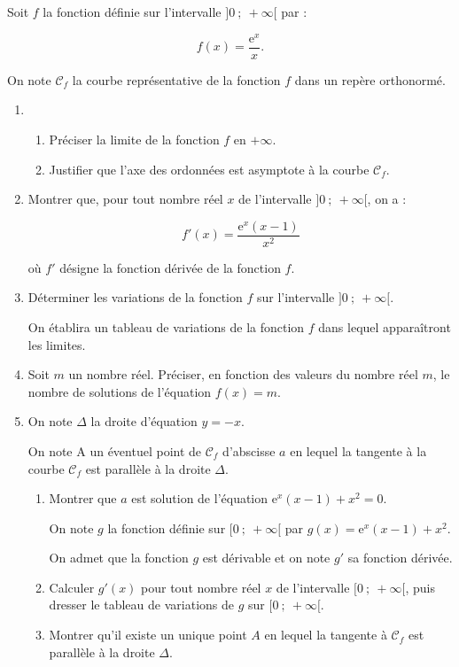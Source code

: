 
\medskip

Soit $f$ la fonction définie sur l'intervalle $]0~;~ +\infty[$ par :

\[f(x) = \dfrac{\text{e}^x}{x}.\]

On note $\mathcal{C}_f$ la courbe représentative de la fonction $f$ dans un repère orthonormé. 

\medskip

\begin{enumerate}
\item 
	\begin{enumerate}
		\item Préciser la limite de la fonction $f$ en $+ \infty$.
		\item Justifier que l'axe des ordonnées est asymptote à la courbe $\mathcal{C}_f$.
	\end{enumerate}
\item  Montrer que, pour tout nombre réel $x$ de l'intervalle $]0~;~ +\infty[$, on a :

\[f'(x) = \dfrac{\text{e}^x(x - 1)}{x^2}\]

où $f'$ désigne la fonction dérivée de la fonction $f$.
\item Déterminer les variations de la fonction $f$ sur l'intervalle $]0~;~ +\infty[$. 

On établira un tableau de variations de la fonction $f$ dans lequel apparaîtront les limites. 
\item Soit $m$ un nombre réel. Préciser, en fonction des valeurs du nombre réel $m$, le nombre de solutions de l'équation $f(x) = m$.
\item  On note $\Delta$ la droite d'équation $y = -x$.

On note A un éventuel point de $\mathcal{C}_f$ d'abscisse $a$ en lequel la tangente à la courbe $\mathcal{C}_f$ est parallèle à la droite $\Delta$.
	\begin{enumerate}
		\item Montrer que $a$ est solution de l'équation $\text{e}^x(x - 1) + x^2  = 0$.
	
On note $g$ la fonction définie sur $[0~;~ +\infty[$ par $g(x) = \text{e}^x(x - 1) + x^2 $.

On admet que la fonction $g$ est dérivable et on note $g'$ sa fonction dérivée.
		\item Calculer $g'(x)$ pour tout nombre réel $x$ de l'intervalle $[0~;~ +\infty[$, puis dresser le tableau de variations de $g$ sur $[0~;~+\infty[$.
		\item Montrer qu'il existe un unique point $A$ en lequel la tangente à $\mathcal{C}_f$ est parallèle à la droite $\Delta$.
	\end{enumerate}
\end{enumerate}

\bigskip


